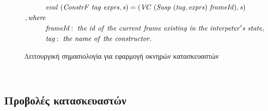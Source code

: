 \documentclass[diploma]{softlab-thesis}
\begin{document}
\begin{figure}[h]
  \begin{align*}
    & \mathit{eval \hfill\ (ConstrF \hfill\ tag \hfill\ exprs, s) = (VC \hfill\ (Susp \hfill\ (tag, exprs) \hfill\ frameId), s)} \\
    \mathit{, where} \\
    &  \mathit{\textit{frameId}: \hfill\ the \hfill\ id \hfill\ of \hfill\ the 
    \hfill\ current \hfill\ frame \hfill\ existing \hfill\ in \hfill\ the \hfill\ interpeter's 
    \hfill\ state,} \\
    &  \mathit{\textit{tag}: \hfill\ the \hfill\ name \hfill\ of \hfill\ the \hfill\ 
    constructor.}
  \end{align*}
\caption{Λειτουργική σημασιολογία για εφαρμογή οκνηρών κατασκευαστών\label{fig:consAppl-el}}
\end{figure} ~


\subsection{Προβολές κατασκευαστών}
\end{document}
